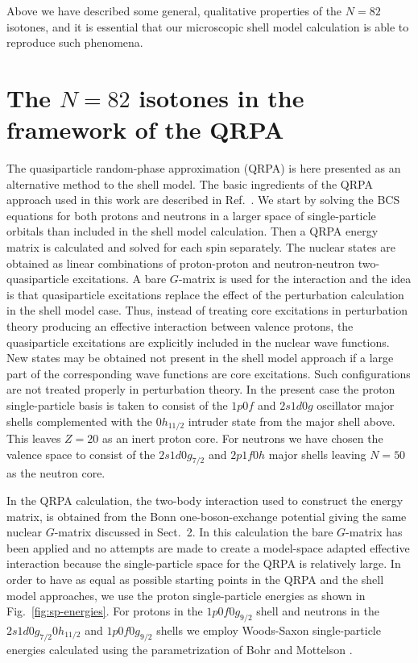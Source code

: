 Above we have described some general, qualitative properties of the $N=82$
isotones, and it is essential that our microscopic shell model calculation is 
able to reproduce such phenomena.



\section{The $N=82$ isotones in the framework of the QRPA}

The quasiparticle random-phase approximation (QRPA) is here presented as an
alternative method to the shell model.
The basic ingredients of the QRPA approach used in this work are described 
in Ref.\ \cite{suh94}. 
We start by solving the BCS equations for both protons 
and neutrons in a larger space of single-particle orbitals than included in 
the shell model calculation. Then a QRPA energy 
matrix is calculated and solved for each spin separately.
The nuclear states are obtained as linear combinations of proton-proton and 
neutron-neutron two-quasiparticle excitations.
A bare $G$-matrix is used for the interaction and the idea is that 
quasiparticle excitations replace 
the effect of the perturbation calculation in 
the shell model case. Thus, instead of treating core excitations in 
perturbation theory producing an effective interaction between valence protons,
the quasiparticle excitations are explicitly included in the nuclear wave 
functions. New states may be obtained not present in the shell model approach 
if a large part of the corresponding wave functions are core excitations. 
Such configurations are not treated properly in perturbation theory.
In the present case the proton single-particle
basis is taken to consist of the $1p0f$ and $2s1d0g$ oscillator major shells
complemented with the $0h_{11/2}$ intruder state from the major shell 
above. This leaves $Z=20$ as an inert proton core.
For neutrons we have chosen the 
valence space to consist of the $2s1d0g_{7/2}$ and $2p1f0h$ major shells 
leaving $N=50$ as the neutron core. 

In the QRPA calculation,
the two-body interaction used to construct the energy matrix,
is obtained from the Bonn one-boson-exchange potential giving the same 
nuclear $G$-matrix discussed in Sect.\ 2. 
In this calculation the bare $G$-matrix has been applied and 
no attempts are made to create a 
model-space adapted effective interaction
because the single-particle space for the QRPA is relatively large.
In order to have as equal as possible starting points in the QRPA and
the shell model approaches, we use the proton single-particle
energies as shown in Fig.\ \ref{fig:sp-energies}. For protons in 
the $1p0f0g_{9/2}$ shell and neutrons in the $2s1d0g_{7/2}0h_{11/2}$
and $1p0f0g_{9/2}$ shells we employ Woods-Saxon single-particle
energies calculated using the parametrization of Bohr and Mottelson
\cite{boh63}. 

